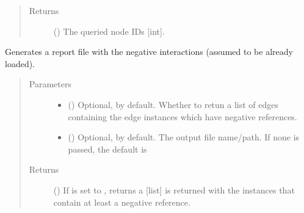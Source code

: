 \documentclass[letterpaper,10pt,english]{sphinxmanual}
\begin{document}
\begin{fulllineitems}
\begin{fulllineitems}
\begin{quote}
\begin{description}
\item[{Returns}] \leavevmode
() \textendash{} The queried node IDs {[}int{]}.

\end{description}\end{quote}

\end{fulllineitems}


\begin{fulllineitems}
\label{\detokenize{reference:pypath.main.PyPath.negative_report}}
Generates a report file with the negative interactions (assumed
to be already loaded).
\begin{quote}\begin{description}
\item[{Parameters}] \leavevmode\begin{itemize}
\item {} 
 () \textendash{} Optional,  by default. Whether to retun a list of
edges containing the edge instances which have negative
references.

\item {} 
 () \textendash{} Optional,  by default. The output file name/path. If
none is passed, the default is

\end{itemize}

\item[{Returns}] \leavevmode
() \textendash{} If  is set to , returns a {[}list{]}
is returned with the  instances that
contain at least a negative reference.

\end{description}\end{quote}

\end{fulllineitems}


\end{fulllineitems}
\end{document}
